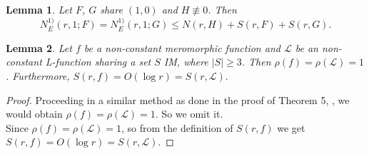 \documentclass[a4paper,draft]{amsproc}
\theoremstyle{plain}
\newtheorem{lem}{Lemma}[section]
\theoremstyle{definition}
\theoremstyle{remark}
\numberwithin{equation}{section}
\renewcommand{\leq}{\leqslant}\renewcommand{\geq}{\geqslant}
\begin{document}
\begin{lem}\label{2.1}\cite{15}
Let $F$, $G$  share $(1,0)$ and $H\not\equiv 0$. Then $$N_{E}^{1)}(r,1;F)=N_{E}^{1)}(r,1;G)\leq N(r,H)+S(r,F)+S(r,G).$$
\end{lem}

\begin{lem}\label{102}
Let $f$ be a non-constant meromorphic function and $\mathcal{L}$ be an non-constant L-function sharing a set $S$ IM, where $|S|\geq3$. Then $\rho(f)=\rho(\mathcal{L})=1$. Furthermore, $ S(r,f)=O(\log r)=S(r,\mathcal{L}).$ 
\end{lem}
\begin{proof}
Proceeding in a similar method as done in the proof of Theorem 5, \cite[see p. 6]{yuan2018}, we would obtain $\rho(f)=\rho(\mathcal{L})=1$. So we omit it.\\
Since $\rho(f)=\rho(\mathcal{L})=1$, so from the definition of $S(r,f)$ we get $S(r,f)=O(\log r)=S(r,\mathcal{L})$.
\end{proof}
\end{document}
